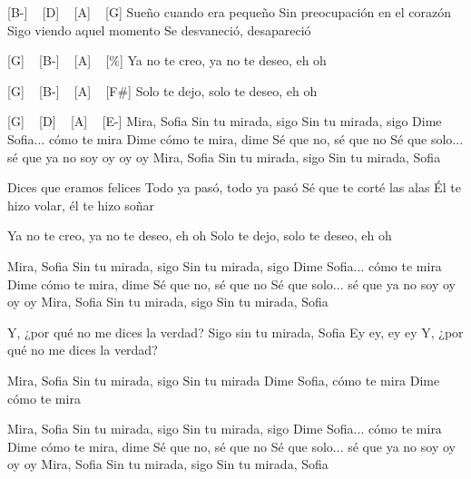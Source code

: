 [B-] ~ [D] ~ [A] ~ [G]
Sueño cuando era pequeño
Sin preocupación en el corazón
Sigo viendo aquel momento
Se desvaneció, desapareció

[G] ~ [B-] ~ [A] ~ [\%]
Ya no te creo, ya no te deseo, eh oh

[G] ~ [B-] ~ [A] ~ [F#]
Solo te dejo, solo te deseo, eh oh

[G] ~ [D] ~ [A] ~ [E-]
Mira, Sofia
Sin tu mirada, sigo
Sin tu mirada, sigo
Dime Sofia... cómo te mira
Dime cómo te mira, dime
Sé que no, sé que no
Sé que solo... sé que ya no soy oy oy oy
Mira, Sofia
Sin tu mirada, sigo
Sin tu mirada, Sofia
 
Dices que eramos felices
Todo ya pasó, todo ya pasó
Sé que te corté las alas
Él te hizo volar, él te hizo soñar
 
Ya no te creo, ya no te deseo, eh oh
Solo te dejo, solo te deseo, eh oh
 
Mira, Sofia
Sin tu mirada, sigo
Sin tu mirada, sigo
Dime Sofia... cómo te mira
Dime cómo te mira, dime
Sé que no, sé que no
Sé que solo... sé que ya no soy oy oy oy
Mira, Sofia
Sin tu mirada, sigo
Sin tu mirada, Sofia
 
Y, ¿por qué no me dices la verdad?
Sigo sin tu mirada, Sofia
Ey ey, ey ey
Y, ¿por qué no me dices la verdad?
 
Mira, Sofia
Sin tu mirada, sigo
Sin tu mirada
Dime Sofia, cómo te mira
Dime cómo te mira
 
Mira, Sofia
Sin tu mirada, sigo
Sin tu mirada, sigo
Dime Sofia... cómo te mira
Dime cómo te mira, dime
Sé que no, sé que no
Sé que solo... sé que ya no soy oy oy oy
Mira, Sofia
Sin tu mirada, sigo
Sin tu mirada, Sofia